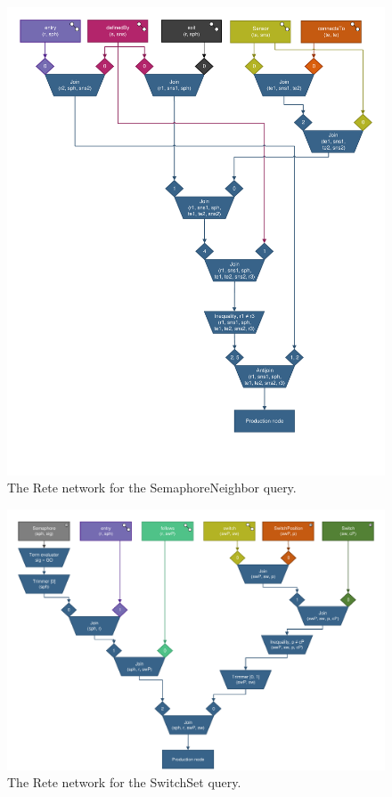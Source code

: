 \begin{figure}[htb]
\begin{center}
\includegraphics[scale=0.5]{figures/rete-semaphoreneighbor-layout.pdf}
\caption{The Rete network for the \textsf{SemaphoreNeighbor} query.}
\label{fig:rete-semaphoreneighbor-layout}
\end{center}
\end{figure}

\begin{figure}[htb]
\begin{center}
\includegraphics[scale=0.5]{figures/rete-switchset-layout.pdf}
\caption{The Rete network for the \textsf{SwitchSet} query.}
\label{fig:rete-switchset-layout}
\end{center}
\end{figure}
